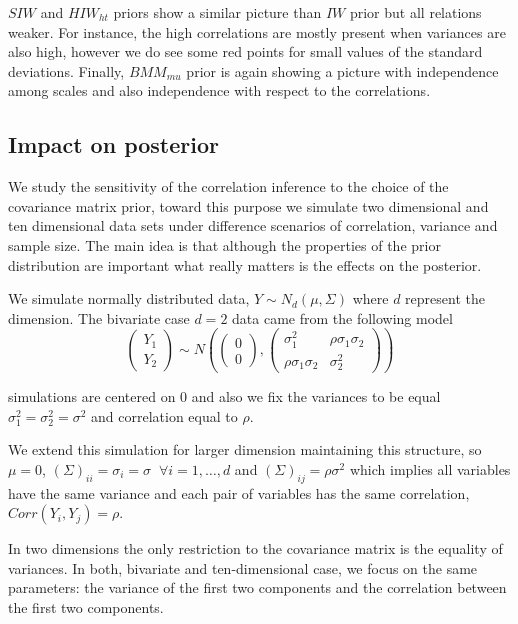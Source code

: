 \documentclass[a4paper]{article}
\begin{document}
$SIW$ and $HIW_{ht}$ priors show a similar picture than $IW$ prior but all relations weaker. For instance, the high correlations are mostly present when variances are also high, however we do see some red points for small values of the standard deviations. 
Finally,  $BMM_{mu}$ prior is again showing a picture with independence among scales and also independence with respect to the correlations. 

\subsection{Impact on posterior} 

We study the sensitivity of the correlation inference to the choice of the covariance matrix prior, toward this purpose we simulate two dimensional and ten dimensional data sets under difference scenarios of correlation, variance and sample size. The main idea is that although the properties of the prior distribution are important what really matters is the effects on the posterior.

We simulate normally distributed data, $Y \sim N_d(\mu, \Sigma) $ where $d$ represent the dimension. The bivariate case $d=2$ data came from the following model 
\begin{equation}
\begin{pmatrix}  Y_1 \\ Y_2 \end{pmatrix} \sim 
N\left( \begin{pmatrix}  0 \\ 0 \end{pmatrix}, \begin{pmatrix}  \sigma_{1}^2 & \rho\sigma_{1}\sigma_{2} \\ \rho\sigma_{1}\sigma_{2} & \sigma_{2}^2 \end{pmatrix} \right)
\label{modsim}
\end{equation} 

simulations are centered on 0 and also we fix the variances to be equal $\sigma_{1}^2=\sigma_{2}^2=\sigma^2$ and correlation equal to $\rho$. 

We extend this simulation for larger dimension maintaining this structure, so $\mu= 0$, $(\Sigma)_{ii} = \sigma_{i}=\sigma \;\; \forall i=1,\ldots,d$ and $(\Sigma)_{ij} = \rho\sigma^2$ which implies all variables have the same variance and each pair of variables has the same correlation, $Corr(Y_{i}, Y_{j}) = \rho$. 

In two dimensions the only restriction to the covariance matrix is the equality of variances. In both, bivariate and ten-dimensional case, we focus on the same parameters: the variance of the first two components and the correlation between the first two components. 
\end{document}

